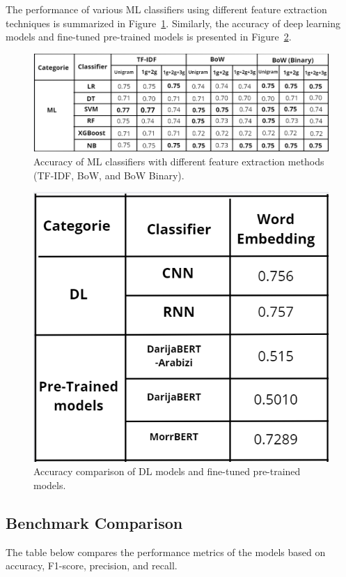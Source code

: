 \documentclass[a4paper,40pt,twocolumn]{article}
\begin{document}
The performance of various ML classifiers using different feature extraction techniques is summarized in Figure~\ref{fig:ml_results}. Similarly, the accuracy of deep learning models and fine-tuned pre-trained models is presented in Figure~\ref{fig:dl_bert_results}.

\begin{figure}[t] %
    \centering
    \includegraphics[width=\textwidth]{dl_bert.png}
    \caption{Accuracy of ML classifiers with different feature extraction methods (TF-IDF, BoW, and BoW Binary).}
    \label{fig:ml_results}
\end{figure}

\begin{figure}[H]
    \centering
    \includegraphics[width=0.6\linewidth]{ml.png}
    \caption{Accuracy comparison of DL models and fine-tuned pre-trained models.}
    \label{fig:dl_bert_results}
\end{figure}

\subsection{Benchmark Comparison}

The table below compares the performance metrics of the models based on accuracy, F1-score, precision, and recall.
\end{document}
